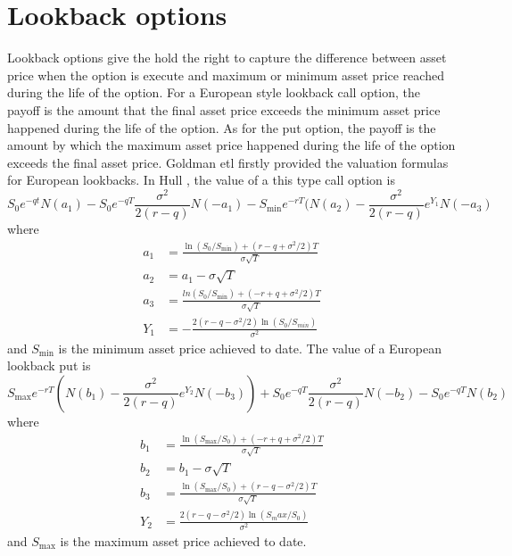 \documentclass[11pt]{book}
\begin{document}

\section{Lookback options}
Lookback options give the hold the right to capture the difference between asset price when the option is execute and maximum or minimum asset price reached during the life of the option. For a European style lookback call option, the payoff is the amount that the final asset price exceeds the minimum asset price happened during the life of the option. As for the put option, the payoff is the amount by which the maximum asset price happened during the life of the option exceeds the final asset price. Goldman etl firstly provided the valuation formulas for European lookbacks. In Hull \cite{Hull2008}, the value of a this type call option is 
\begin{equation}\label{eq:3}
S_0e^{-qt}N(a_1) - S_0 e^{-qT}\frac{\sigma ^2}{2(r-q)} N(-a_1) - S_{\min} e^{-rT}(N(a_2) - \frac{\sigma^2}{2(r-q)} e ^{Y_1} N(-a_3) 
\end{equation}
where
\begin{equation}\label{eq:4}
\begin{split}
a_1 &=\frac{\ln(S_0 / S_{\min}) + (r-q+\sigma^2 /2)T}{\sigma \sqrt{T}}\\
a_2 &= a_1 - \sigma \sqrt{T}\\
a_3 &= \frac{ln(S_0 / S_{\min})+ (-r+q+\sigma^2 / 2)T}{\sigma \sqrt{T}}\\
Y_1 &= - \frac{2(r-q-\sigma^2 / 2) \ln(S_0 / S_{min})}{\sigma^2}
\end{split}
\end{equation}
and $S_{\min}$ is the minimum asset price achieved to date. 
The value of a European lookback put is 
\begin{equation}\label{eq:5}
S_{\max} e^{-rT} ( N(b_1) - \frac{\sigma^2}{2(r-q)} e^{Y_2} N(-b_3)) + S_0 e^{-qT}\frac{\sigma^2}{2(r-q)} N(-b_2) - S_0 e^{-qT} N(b_2)
\end{equation}
where 
\begin{equation}\label{eq:6}
\begin{split}
b_1 &= \frac{\ln(S_{\max} / S_0) + (-r + q + \sigma^2 /2)T}{\sigma \sqrt{T}}\\
b_2 &= b_1 - \sigma \sqrt{T}\\
b_3 &= \frac{\ln(S_{\max} / S_0) + (r-q-\sigma^2 /2)T}{\sigma \sqrt{T}}\\
Y_2 &= \frac{2(r-q-\sigma^2 / 2) \ln(S_max / S_0)}{\sigma^2}
\end{split}
\end{equation}
and $S_{\max}$ is the maximum asset price achieved to date. 
\end{document}
